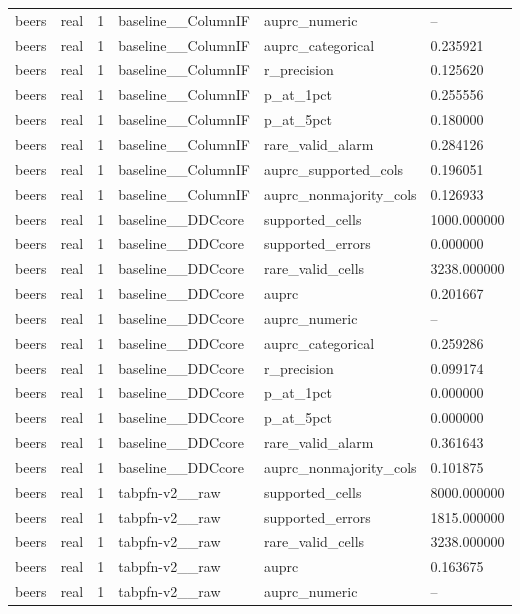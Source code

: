 \begin{tabular}{llllll}
beers & real & 1 & baseline\_\_ColumnIF & auprc\_numeric & -- \\
beers & real & 1 & baseline\_\_ColumnIF & auprc\_categorical & 0.235921 \\
beers & real & 1 & baseline\_\_ColumnIF & r\_precision & 0.125620 \\
beers & real & 1 & baseline\_\_ColumnIF & p\_at\_1pct & 0.255556 \\
beers & real & 1 & baseline\_\_ColumnIF & p\_at\_5pct & 0.180000 \\
beers & real & 1 & baseline\_\_ColumnIF & rare\_valid\_alarm & 0.284126 \\
beers & real & 1 & baseline\_\_ColumnIF & auprc\_supported\_cols & 0.196051 \\
beers & real & 1 & baseline\_\_ColumnIF & auprc\_nonmajority\_cols & 0.126933 \\
beers & real & 1 & baseline\_\_DDCcore & supported\_cells & 1000.000000 \\
beers & real & 1 & baseline\_\_DDCcore & supported\_errors & 0.000000 \\
beers & real & 1 & baseline\_\_DDCcore & rare\_valid\_cells & 3238.000000 \\
beers & real & 1 & baseline\_\_DDCcore & auprc & 0.201667 \\
beers & real & 1 & baseline\_\_DDCcore & auprc\_numeric & -- \\
beers & real & 1 & baseline\_\_DDCcore & auprc\_categorical & 0.259286 \\
beers & real & 1 & baseline\_\_DDCcore & r\_precision & 0.099174 \\
beers & real & 1 & baseline\_\_DDCcore & p\_at\_1pct & 0.000000 \\
beers & real & 1 & baseline\_\_DDCcore & p\_at\_5pct & 0.000000 \\
beers & real & 1 & baseline\_\_DDCcore & rare\_valid\_alarm & 0.361643 \\
beers & real & 1 & baseline\_\_DDCcore & auprc\_nonmajority\_cols & 0.101875 \\
beers & real & 1 & tabpfn-v2\_\_raw & supported\_cells & 8000.000000 \\
beers & real & 1 & tabpfn-v2\_\_raw & supported\_errors & 1815.000000 \\
beers & real & 1 & tabpfn-v2\_\_raw & rare\_valid\_cells & 3238.000000 \\
beers & real & 1 & tabpfn-v2\_\_raw & auprc & 0.163675 \\
beers & real & 1 & tabpfn-v2\_\_raw & auprc\_numeric & -- \\

\end{tabular}
